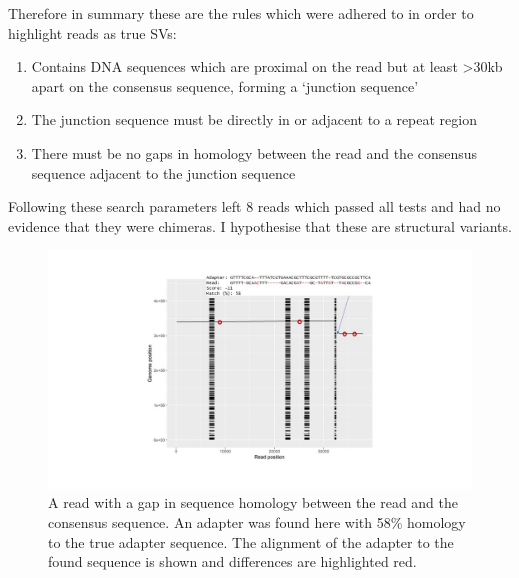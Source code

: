 \documentclass{article}
\begin{document}
Therefore in summary these are the rules which were adhered to in order to highlight reads as true SVs:

\begin{enumerate}
\item Contains DNA sequences which are proximal on the read but at least >30kb apart on the consensus sequence, forming a `junction sequence'
\item The junction sequence must be directly in or adjacent to a repeat region
\item There must be no gaps in homology between the read and the consensus sequence adjacent to the junction sequence
\end{enumerate}


Following these search parameters left 8 reads which passed all tests and had no evidence that they were chimeras. I hypothesise that these are structural variants. 

\begin{figure}[h!]
\centering
\includegraphics[width=\textwidth{}]{Chapter_2/Adapter read1123.jpg}
\caption{A read with a gap in sequence homology between the read and the consensus sequence. An adapter was found here with 58\% homology to the true adapter sequence. The alignment of the adapter to the found sequence is shown and differences are highlighted red. }
\label{fig:Adapter_in_gap}
\end{figure}

\begin{table}[]
\caption{Table outlining the categories reads were placed into and how many adapter sequences were found. The 8 reads which passed all filtering are highlighted in yellow.}
\label{tab:Adapter_Summary}
\end{table}
\end{document}
